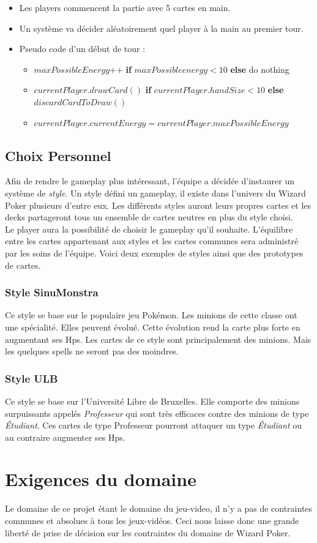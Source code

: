 \begin{itemize}[labelindent=16pt]
    \item Les players commencent la partie avec 5 cartes en main.
    \item Un système va décider aléatoirement quel player à la main au premier tour.
    \item Pseudo code d'un début de tour :
    \begin{itemize}[label=\textasteriskcentered]
        \item $maxPossibleEnergy$++ \textbf{if} $maxPossibleenergy < 10$ \textbf{else} do nothing
        \item $currentPlayer.drawCard()$ \textbf{if} $currentPlayer.handSize < 10$ \textbf{else} $discardCardToDraw()$
        \item $currentPlayer.currentEnergy = currentPlayer.maxPossibleEnergy$
    \end{itemize}
    
\end{itemize}

\subsection{Choix Personnel}
{
\noindent Afin de rendre le gameplay plus intéressant, l'équipe a décidée d'instaurer un système de \emph{style}. Un style défini un gameplay, il existe dans l'univers du Wizard Poker plusieurs d'entre eux. Les différents styles auront leurs propres cartes et les decks partageront tous  un ensemble de cartes neutres en plus du style choisi.\\
Le player aura la possibilité de choisir le gameplay qu'il souhaite. L'équilibre entre les cartes appartenant aux styles et les cartes communes sera administré par les soins de l'équipe. Voici deux exemples de styles ainsi que des prototypes de cartes.
}
\subsubsection{Style SinuMonstra}
{
\noindent Ce style se base sur le populaire jeu Pokémon. Les minions de cette classe ont une spécialité. Elles peuvent évolué. Cette évolution rend la carte plus forte en augmentant ses Hps. Les cartes de ce style sont principalement des minions. Mais les quelques spells ne seront pas des moindres.

}
\subsubsection{Style ULB}
{
\noindent Ce style se base sur l'Université Libre de Bruxelles. Elle comporte des minions surpuissants appelés \emph{Professeur} qui sont très efficaces contre des minions de type \emph{Étudiant}. Ces cartes de type Professeur pourront attaquer un type \emph{Étudiant} ou au contraire augmenter ses Hps.

}
\section{Exigences du domaine}
{
\noindent Le domaine de ce projet étant le domaine du jeu-video, il n'y a pas de contraintes communes et absolues à tous les jeux-vidéos. Ceci nous laisse donc une grande liberté de prise de décision sur les contraintes du domaine de Wizard Poker.
}